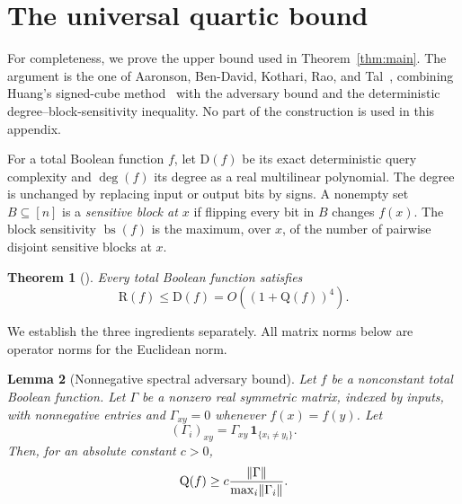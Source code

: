 \documentclass[11pt]{article}
\newtheorem{theorem}{Theorem}[section]
\newtheorem{lemma}[theorem]{Lemma}
\theoremstyle{definition}
\newcommand{\R}{\mathrm R}
\newcommand{\Q}{\mathrm Q}
\newcommand{\D}{\mathrm D}
\newcommand{\bs}{\operatorname{bs}}
\DeclarePairedDelimiter{\norm}{\lVert}{\rVert}
\begin{document}
\appendix
\section{The universal quartic bound}\label{sec:upper}

For completeness, we prove the upper bound used in
Theorem~\ref{thm:main}. The argument is the one of Aaronson, Ben-David,
Kothari, Rao, and Tal~\cite{ABKRT21}, combining Huang's signed-cube
method~\cite{Huang19} with the adversary bound and the deterministic
degree--block-sensitivity inequality. No part of the construction is
used in this appendix.

For a total Boolean function $f$, let $\D(f)$ be its exact deterministic
query complexity and $\deg(f)$ its degree as a real multilinear polynomial.
The degree is unchanged by replacing input or output bits by signs.
A nonempty set $B\subseteq[n]$ is a \emph{sensitive block at $x$} if
flipping every bit in $B$ changes $f(x)$. The block sensitivity $\bs(f)$
is the maximum, over $x$, of the number of pairwise disjoint sensitive
blocks at $x$.

\begin{theorem}[\cite{ABKRT21}]\label{thm:quartic-upper}
Every total Boolean function satisfies
\[
 \R(f)\le\D(f)=O((1+\Q(f))^4).
\]
\end{theorem}

We establish the three ingredients separately. All matrix norms below
are operator norms for the Euclidean norm.

\begin{lemma}[Nonnegative spectral adversary bound]
\label{lem:adversary}
Let $f$ be a nonconstant total Boolean function. Let $\Gamma$ be a nonzero
real symmetric matrix, indexed by inputs, with nonnegative entries and
$\Gamma_{xy}=0$ whenever $f(x)=f(y)$. Let
\[
 (\Gamma_i)_{xy}=\Gamma_{xy}\,\mathbf1_{\{x_i\ne y_i\}}.
\]
Then, for an absolute constant $c>0$,
\[
 \Q(f)\ge c\frac{\norm{\Gamma}}{\max_i\norm{\Gamma_i}}.
\]
\end{lemma}
\end{document}
